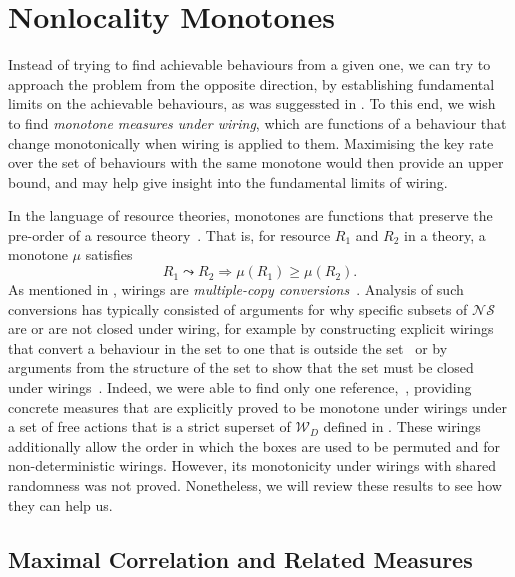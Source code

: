 \documentclass[10pt, a4paper]{article}
\numberwithin{equation}{section} %
\theoremstyle{definition}
\theoremstyle{plain}
\newcommand{\?}{\mathrel{?}} %
\newcommand{\sW}{\mathcal{W}}
\newcommand{\NSs}{\mathcal{NS}}
\begin{document}
    \section{Nonlocality Monotones}\label{sec:nlmono}

    Instead of trying to find achievable behaviours from a given one, we can try to approach the problem from the opposite direction, by establishing fundamental limits on the achievable behaviours, as was suggessted in . To this end, we wish to find \emph{monotone measures under wiring}, which are functions of a behaviour that change monotonically when wiring is applied to them. Maximising the key rate over the set of behaviours with the same monotone would then provide an upper bound, and may help give insight into the fundamental limits of wiring.

    In the language of resource theories, monotones are functions that preserve the pre-order of a resource theory~\cite{BellResourceTheory}. That is, for resource \(R_1\) and \(R_2\) in a theory, a monotone \(\mu\) satisfies
    \begin{equation}
      R_1 \leadsto R_2 \Rightarrow \mu(R_1) \geq \mu(R_2).
    \end{equation}
    As mentioned in , wirings are \emph{multiple-copy conversions}~\cite{BellResourceTheory}. Analysis of such conversions has typically consisted of arguments for why specific subsets of \(\NSs\) are or are not closed under wiring, for example by constructing explicit wirings that convert a behaviour in the set to one that is outside the set~\cite{ClosedCorrSets} or by arguments from the structure of the set to show that the set must be closed under wirings~\cite{NonlocalZoo}. Indeed, we were able to find only one reference,~\cite{NLMonotones}, providing concrete measures that are explicitly proved to be monotone under wirings under a set of free actions that is a strict superset of \(\sW_D\) defined in . These wirings additionally allow the order in which the boxes are used to be permuted and for non-deterministic wirings. However, its monotonicity under wirings with shared randomness was not proved. Nonetheless, we will review these results to see how they can help us.

    \subsection{Maximal Correlation and Related Measures}\label{sec:nlmono_maxcorr}
\end{document}
